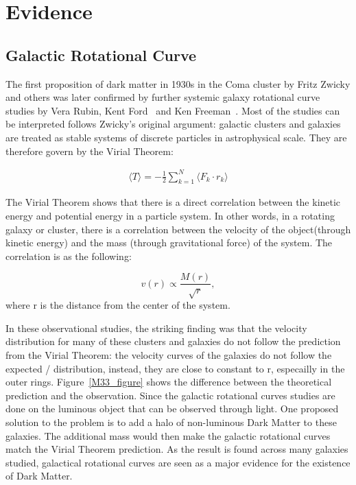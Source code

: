 \section{Evidence}
\label{section:evidence}
\subsection{Galactic Rotational Curve}
    The first proposition of dark matter in 1930s in the Coma cluster by Fritz Zwicky and others was later confirmed by further systemic galaxy rotational curve studies by Vera Rubin, Kent Ford~\cite{Rubin} and Ken Freeman~\cite{freeman}.  
    Most of the studies can be interpreted follows Zwicky's original argument: galactic clusters and galaxies are treated as stable systems of discrete particles in astrophysical scale. They are therefore govern by the Virial Theorem:

\begin{align}
\begin{equation}
     \langle T \rangle = -\frac{1}{2} \sum_{k=1}^{N} \langle F_{k} \cdot r_{k} \rangle
    \label{eq:virial}

\end{equation}
\end{align}

    The Virial Theorem shows that there is a direct correlation between the kinetic energy and potential energy in a particle system. In other words, in a rotating galaxy or cluster, there is a correlation between the velocity of the object(through kinetic energy) and the mass (through gravitational force) of the system. The correlation is as the following:
    
     $$ v(r) \varpropto \frac{M(r)}{\sqrt{r}}, $$ where r is the distance from the center of the system.

     In these observational studies, the striking finding was that the velocity distribution for many of these clusters and galaxies do not follow the prediction from the Virial Theorem: the velocity curves of the galaxies do not follow the expected / distribution, instead, they are close to constant to r, especailly in the outer rings. Figure~\ref{M33_figure} shows the difference between the theoretical prediction and the observation. 
     Since the galactic rotational curves studies are done on the luminous object that can be observed through light. One proposed solution to the problem is to add a halo of non-luminous Dark Matter to these galaxies. The additional mass would then make the galactic rotational curves match the Virial Theorem prediction. As the result is found across many galaxies studied, galactical rotational curves are seen as a major evidence for the existence of Dark Matter. 

